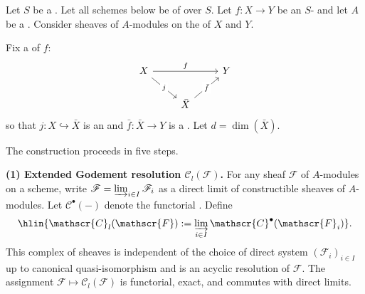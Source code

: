 \begin{definition} \label{definition:exceptional_inverse_image_functor_on_the_bounded_below_derived_categories_of_etale_sheaves_with_torsion_coefficients_on_schemes_of_finite_type_over_a_noetherian_scheme_via_a_compactifiable_morphism}

    Let $S$ be a . Let all schemes below be of  over $S$. Let $f: X \to Y$ be an $S$- and let $A$ be a  . Consider sheaves of $A$-modules on the  of $X$ and $Y$.

    Fix a  of $f$:
    $$
    \begin{tikzcd}
    X \ar[rr, "f"] \ar[dr, "j"' description] & & Y \\
    & \bar{X} \ar[ur, "\bar{f}"' description] &
    \end{tikzcd}
    $$
    so that $j: X \hookrightarrow \bar{X}$ is an  and $\bar{f}: \bar{X} \to Y$ is a . Let $d = \dim(\bar{X})$.

    The construction proceeds in five steps.

    \textbf{(1) Extended Godement resolution $\mathscr{C}_l(\mathscr{F})$.} For any sheaf $\mathscr{F}$ of $A$-modules on a scheme, write $\mathscr{F} = \varinjlim_{i \in I} \mathscr{F}_i$ as a direct limit of constructible sheaves of $A$-modules. Let $\mathscr{C}^\bullet(-)$ denote the functorial . Define
    $$\hlin{\mathscr{C}_l(\mathscr{F}) := \varinjlim_{i \in I} \mathscr{C}^\bullet(\mathscr{F}_i)}.$$
    This complex of sheaves is independent of the choice of direct system $(\mathscr{F}_i)_{i \in I}$ up to canonical quasi-isomorphism and is an acyclic resolution of $\mathscr{F}$. The assignment $\mathscr{F} \mapsto \mathscr{C}_l(\mathscr{F})$ is functorial, exact, and commutes with direct limits.


\end{definition}
